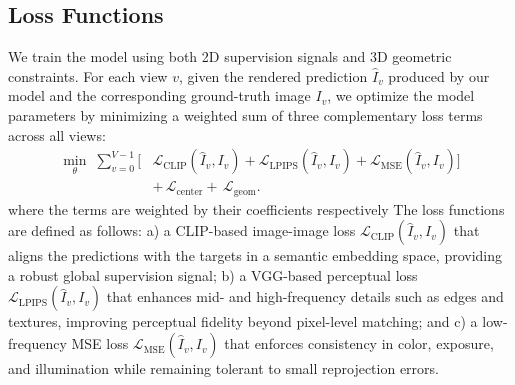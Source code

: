 \subsection{Loss Functions}
We train the model using both 2D supervision signals and 3D geometric constraints.  
%
For each view $v$, given the rendered prediction $\hat I_v$ produced by our model and the corresponding ground-truth image $I_v$, 
we optimize the model parameters by minimizing a weighted sum of three complementary loss terms across all views:
\begin{equation*}
\begin{split}
\label{eq:edit-loss}
\min_{\theta}\; \sum_{v=0}^{V-1}\Big[
&\mathcal{L}_{\text{CLIP}}(\hat I_v, I_v)
+\mathcal{L}_{\text{LPIPS}}(\hat I_v, I_v)
+\mathcal{L}_{\text{MSE}}(\hat I_v, I_v)
\Big] \\
&+\, \mathcal{L}_{\text{center}}
+\, \mathcal{L}_{\text{geom}}.
\end{split}
\end{equation*}
where the terms are weighted by their coefficients respectively
%
The loss functions are defined as follows:  
a) a CLIP-based image-image loss $\mathcal{L}_{\text{CLIP}}(\hat I_v, I_v)$ that aligns the predictions with the targets in a semantic embedding space, providing a robust global supervision signal;  
b) a VGG-based perceptual loss $\mathcal{L}_{\text{LPIPS}}(\hat I_v, I_v)$ that enhances mid- and high-frequency details such as edges and textures, improving perceptual fidelity beyond pixel-level matching; and  
c) a low-frequency MSE loss $\mathcal{L}_{\text{MSE}}(\hat I_v, I_v)$ that enforces consistency in color, exposure, and illumination while remaining tolerant to small reprojection errors.

